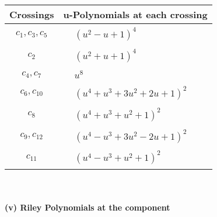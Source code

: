 \documentclass[1p]{elsarticle_modified}
\theoremstyle{definition}
\begin{document}
\begin{tabular}{m{50pt}|m{274pt}}
Crossings & \hspace{64pt}u-Polynomials at each crossing \\
\hline $$\begin{aligned}c_{1},c_{3},c_{5}\end{aligned}$$&$\begin{aligned}
&(u^2- u+1)^4
\end{aligned}$\\
\hline $$\begin{aligned}c_{2}\end{aligned}$$&$\begin{aligned}
&(u^2+u+1)^4
\end{aligned}$\\
\hline $$\begin{aligned}c_{4},c_{7}\end{aligned}$$&$\begin{aligned}
&u^8
\end{aligned}$\\
\hline $$\begin{aligned}c_{6},c_{10}\end{aligned}$$&$\begin{aligned}
&(u^4+u^3+3 u^2+2 u+1)^2
\end{aligned}$\\
\hline $$\begin{aligned}c_{8}\end{aligned}$$&$\begin{aligned}
&(u^4+u^3+u^2+1)^2
\end{aligned}$\\
\hline $$\begin{aligned}c_{9},c_{12}\end{aligned}$$&$\begin{aligned}
&(u^4- u^3+3 u^2-2 u+1)^2
\end{aligned}$\\
\hline $$\begin{aligned}c_{11}\end{aligned}$$&$\begin{aligned}
&(u^4- u^3+u^2+1)^2
\end{aligned}$\\
\hline
\end{tabular}\\~\\
\newpage\renewcommand{\arraystretch}{1}
\flushleft \textbf{(v) Riley Polynomials at the component}\newline \\
\end{document}
